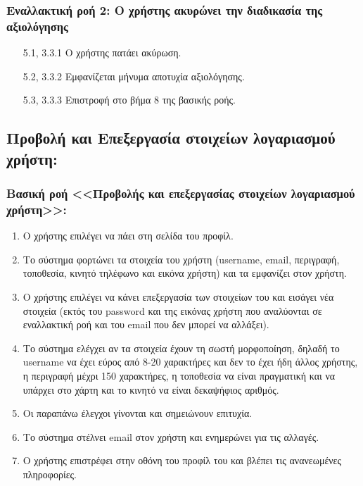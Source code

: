 \documentclass[12pt,a4paper]{article}
\begin{document}
\subsubsection*{Εναλλακτική ροή 2: Ο χρήστης ακυρώνει την διαδικασία της αξιολόγησης}
\begin{enumerate}
    \item [5.1, 3.3.1] Ο χρήστης πατάει ακύρωση.
    \item [5.2, 3.3.2] Εμφανίζεται μήνυμα αποτυχία αξιολόγησης.
    \item [5.3, 3.3.3] Επιστροφή στο βήμα 8 της βασικής ροής.
\end{enumerate}

\subsection{Προβολή και Επεξεργασία στοιχείων λογαριασμού χρήστη:}

\subsubsection*{Βασική ροή <<Προβολής και επεξεργασίας στοιχείων λογαριασμού \\χρήστη>>:}
\begin{enumerate}
    \item Ο χρήστης επιλέγει να πάει στη σελίδα του προφίλ. 
    \item Το σύστημα φορτώνει τα στοιχεία του χρήστη (username, email, περιγραφή, τοποθεσία, κινητό τηλέφωνο και εικόνα χρήστη) και τα εμφανίζει στον χρήστη.
    \item Ο χρήστης επιλέγει να κάνει επεξεργασία των στοιχείων του και εισάγει νέα στοιχεία (εκτός του password και της εικόνας χρήστη που αναλύονται σε εναλλακτική ροή και του email που δεν μπορεί να αλλάξει). 
    \item Το σύστημα ελέγχει αν τα στοιχεία έχουν τη σωστή μορφοποίηση, δηλαδή το username να έχει εύρος από 8-20 χαρακτήρες και δεν το έχει ήδη άλλος χρήστης, η περιγραφή μέχρι 150 χαρακτήρες, η τοποθεσία να είναι πραγματική και να υπάρχει στο χάρτη και το κινητό να είναι δεκαψήφιος αριθμός.
    \item Οι παραπάνω έλεγχοι γίνονται και σημειώνουν επιτυχία.
    \item Το σύστημα στέλνει email στον χρήστη και ενημερώνει για τις αλλαγές.
    \item Ο χρήστης επιστρέφει στην οθόνη του προφίλ του και βλέπει τις ανανεωμένες πληροφορίες.
\end{enumerate}
\end{document}
